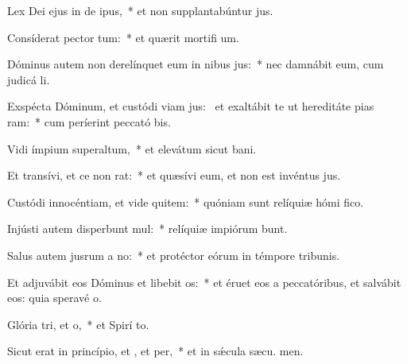 \item Lex Dei ejus in de ipus,~* et non supplantabúntur  jus.
\item Consíderat pector tum:~* et quærit mortifi um.
\item Dóminus autem non derelínquet eum in nibus jus:~* nec damnábit eum, cum judicá li.
\item Exspécta Dóminum, et custódi viam jus:~\pscross{} et exaltábit te ut hereditáte pias ram:~* cum períerint peccató bis.
\item Vidi ímpium superaltum,~* et elevátum sicut  bani.
\item Et transívi, et ce non rat:~* et quæsívi eum, et non est invéntus  jus.
\item Custódi innocéntiam, et vide quitem:~* quóniam sunt relíquiæ hómi fico.
\item Injústi autem disperbunt mul:~* relíquiæ impiórum bunt.
\item Salus autem jusrum a no:~* et protéctor eórum in témpore tribunis.
\item Et adjuvábit eos Dóminus et libebit os:~* et éruet eos a peccatóribus, et salvábit eos: quia speravé  o.
\item Glória tri, et o,~* et Spirí to.
\item Sicut erat in princípio, et , et per,~* et in sǽcula sæcu. men.
